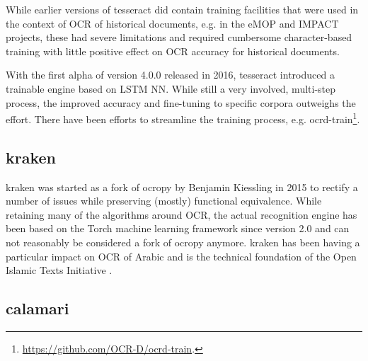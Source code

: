 \documentclass[conference]{IEEEtran}
\begin{document}
While earlier versions of tesseract did contain training facilities that
were used in the context of OCR of historical documents, e.g. in the eMOP
\cite{doi:10.1093/llc/fqv062} and IMPACT \cite{PSNC} projects, these had
severe limitations and required cumbersome
character-based training with little positive effect on OCR accuracy
for historical documents.


With the first alpha of version 4.0.0 released in 2016, tesseract introduced a trainable
engine based on LSTM NN. While still a very involved, multi-step process, the
improved accuracy and fine-tuning to specific corpora outweighs the effort.
There have been efforts to streamline the training process, e.g.
ocrd-train\footnote{\url{https://github.com/OCR-D/ocrd-train}.}.


\subsection*{kraken}

kraken \cite{DBLP:journals/corr/RomanovMSK17} was started as a fork of ocropy
by Benjamin Kiessling in 2015 to rectify a number of issues while preserving
(mostly) functional equivalence. While retaining many of the algorithms around
OCR, the actual recognition engine has been based on the Torch machine learning
framework since version 2.0 and can not reasonably be considered a fork of
ocropy anymore. kraken has been having a particular impact on OCR
of Arabic and is the technical foundation of the Open Islamic Texts
Initiative \cite{miller_romanov_savant_2018}.


\subsection*{calamari}
\end{document}
